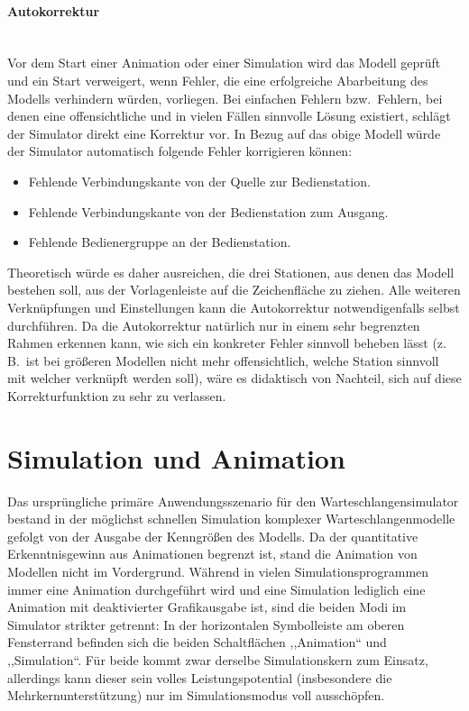 \documentclass[deutsch]{svmono}
\begin{document}
\paragraph{Autokorrektur}~\\
Vor dem Start einer Animation oder einer Simulation wird das Modell geprüft und ein Start verweigert, wenn Fehler, die eine erfolgreiche Abarbeitung des Modells verhindern würden, vorliegen. Bei einfachen Fehlern bzw.\ Fehlern, bei denen eine offensichtliche und in vielen Fällen sinnvolle Lösung existiert, schlägt der Simulator direkt eine Korrektur vor. In Bezug auf das obige Modell würde der Simulator automatisch folgende Fehler korrigieren können:
\begin{itemize}
\item
Fehlende Verbindungskante von der Quelle zur Bedienstation.
\item
Fehlende Verbindungskante von der Bedienstation zum Ausgang.
\item
Fehlende Bedienergruppe an der Bedienstation.
\end{itemize}
Theoretisch würde es daher ausreichen, die drei Stationen, aus denen das Modell bestehen soll, aus der Vorlagenleiste auf die Zeichenfläche zu ziehen. Alle weiteren Verknüpfungen und Einstellungen kann die Autokorrektur notwendigenfalls selbst durchführen. Da die Autokorrektur natürlich nur in einem sehr begrenzten Rahmen erkennen kann, wie sich ein konkreter Fehler sinnvoll beheben lässt (z.\,B.\ ist bei größeren Modellen nicht mehr offensichtlich, welche Station sinnvoll mit welcher verknüpft werden soll), wäre es didaktisch von Nachteil, sich auf diese Korrekturfunktion zu sehr zu verlassen.



\section{Simulation und Animation}

Das ursprüngliche primäre Anwendungsszenario für den Warteschlangensimulator bestand in der möglichst schnellen Simulation komplexer Warteschlangenmodelle gefolgt von der Ausgabe der Kenngrößen des Modells. Da der quantitative Erkenntnisgewinn aus Animationen begrenzt ist, stand die Animation von Modellen nicht im Vordergrund. Während in vielen Simulationsprogrammen immer eine Animation durchgeführt wird und eine Simulation lediglich eine Animation mit deaktivierter Grafikausgabe ist, sind die beiden Modi im Simulator strikter getrennt: In der horizontalen Symbolleiste am oberen Fensterrand befinden sich die beiden Schaltflächen ,,Animation`` und ,,Simulation``. Für beide kommt zwar derselbe Simulationskern zum Einsatz, allerdings kann dieser sein volles Leistungspotential (insbesondere die Mehrkernunterstützung) nur im Simulationsmodus voll ausschöpfen.
\end{document}
